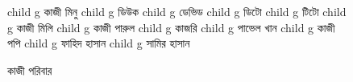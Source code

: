 \documentclass{article}
\begin{document}
\begin{figure}
{\begin{genealogypicture}
{{{{{{              }
              child{    g{ কাজী মিনু  } 
              child{    g{  ডিউক }   }
              child{    g{ ডেভিড }   }
              child{    g{ ডিটো }   }
              child{    g{ টিটো }   }
              }
              child{    g{ কাজী মিলি }   }
              child{    g{ কাজী পারুল }
                  child{    g{ কাজরি }   }
                  child{    g{ পাভেল খান }   }
              }
              child{    g{ কাজী পপি }
                  child{    g{ ফাহিদ হাসান }   }
                  child{    g{ সামির হাসান }   }
              }

          }

      }
    }
    }

    }
    \end{genealogypicture}
    }
    \begin{comment}
      child{
        g{ কাজী }

      }
      \end{comment}
    \caption{কাজী পরিবার}
    \end{figure}
    
\end{document}
